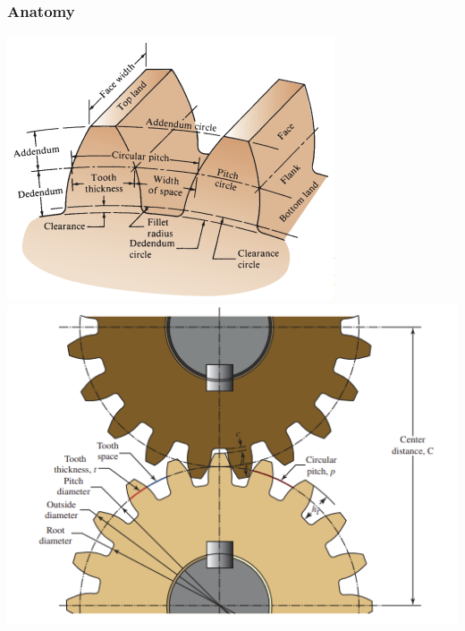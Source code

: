 \documentclass[11pt, fleqn]{article}
\begin{document}
\subsubsection{Anatomy}
\includegraphics[scale=0.9]{Gears/Diagram.png}
\includegraphics[scale=0.9]{Gears/TwoGearDiagram.png}
\end{document}
